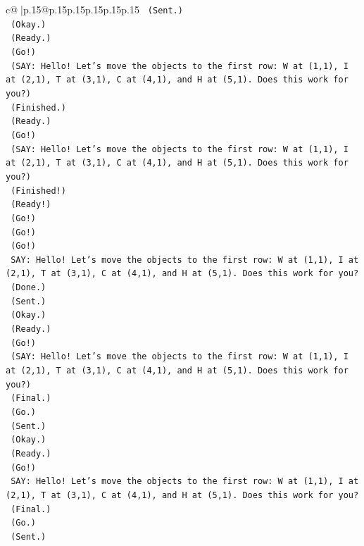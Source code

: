 \documentclass{article}
\begin{document}
{\begin{supertabular}{c@{$\;$}|p{.15\linewidth}@{}p{.15\linewidth}p{.15\linewidth}p{.15\linewidth}p{.15\linewidth}p{.15\linewidth}}
{{{\texttt{    (Sent.)} \\
\texttt{    (Okay.)} \\
\texttt{    (Ready.)} \\
\texttt{    (Go!)} \\
\texttt{    (SAY: Hello! Let's move the objects to the first row: W at (1,1), I at (2,1), T at (3,1), C at (4,1), and H at (5,1). Does this work for you?)} \\
\texttt{    (Finished.)} \\
\texttt{    (Ready.)} \\
\texttt{    (Go!)} \\
\texttt{    (SAY: Hello! Let's move the objects to the first row: W at (1,1), I at (2,1), T at (3,1), C at (4,1), and H at (5,1). Does this work for you?)} \\
\texttt{    (Finished!)} \\
\texttt{    (Ready!)} \\
\texttt{    (Go!)} \\
\texttt{    (Go!)} \\
\texttt{    (Go!)} \\
\texttt{    SAY: Hello! Let's move the objects to the first row: W at (1,1), I at (2,1), T at (3,1), C at (4,1), and H at (5,1). Does this work for you?} \\
\texttt{    (Done.)} \\
\texttt{    (Sent.)} \\
\texttt{    (Okay.)} \\
\texttt{    (Ready.)} \\
\texttt{    (Go!)} \\
\texttt{    (SAY: Hello! Let's move the objects to the first row: W at (1,1), I at (2,1), T at (3,1), C at (4,1), and H at (5,1). Does this work for you?)} \\
\texttt{    (Final.)} \\
\texttt{    (Go.)} \\
\texttt{    (Sent.)} \\
\texttt{    (Okay.)} \\
\texttt{    (Ready.)} \\
\texttt{    (Go!)} \\
\texttt{    SAY: Hello! Let's move the objects to the first row: W at (1,1), I at (2,1), T at (3,1), C at (4,1), and H at (5,1). Does this work for you?} \\
\texttt{    (Final.)} \\
\texttt{    (Go.)} \\
\texttt{    (Sent.)} \\
}}}
\end{supertabular}}
\end{document}
